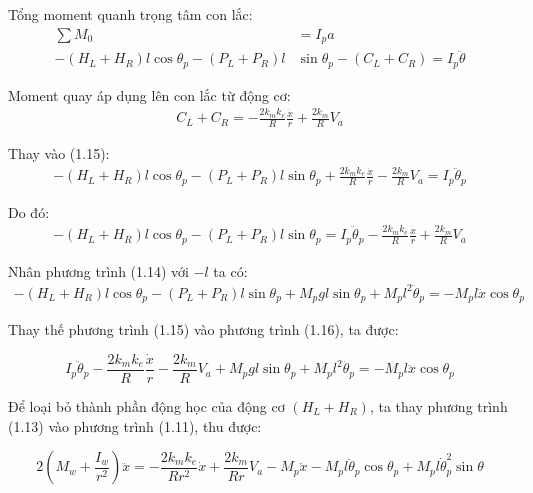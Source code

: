             Tổng moment quanh trọng tâm con lắc:
            \begin{align}
                \sum M_0 &= I_p a \nonumber \\
                -(H_L + H_R) l \cos \theta_p - (P_L + P_R) l&    \sin \theta_p - (C_L + C_R) = I_p \ddot{\theta} 
            \end{align}
            
            Moment quay áp dụng lên con lắc từ động cơ:
            \begin{align*}
                C_L + C_R = -\frac{2k_m k_e}{R} \frac{\dot{x}}{r} + \frac{2k_m}{R} V_a 
            \end{align*}
            
            Thay vào (1.15):
            \begin{align*}
                -(H_L + H_R) l \cos \theta_p - (P_L + P_R) l \sin \theta_p + \frac{2k_m k_e}{R} \frac{\dot{x}}{r} - \frac{2k_m}{R} V_a = I_p \ddot{\theta}_{p} 
            \end{align*}

            Do đó:
            \begin{align}
                -(H_L + H_R) l \cos \theta_p - (P_L + P_R) l \sin \theta_p = I_p \ddot{\theta}_{p} - \frac{2k_m k_e}{R} \frac{\dot{x}}{r} + \frac{2k_m}{R} V_a
            \end{align}

            Nhân phương trình (1.14) với $-l$ ta có:
            \begin{align*}
                -(H_L + H_R) l \cos \theta_p - (P_L + P_R) l \sin \theta_p + M_p g l \sin \theta_p + M_p l^2 \ddot{\theta}_p = -M_p l \ddot{x} \cos \theta_p 
            \end{align*}

            Thay thế phương trình (1.15) vào phương trình (1.16), ta được:

            \begin{equation}
                I_p \ddot{\theta}_p - \frac{2k_m k_e}{R} \frac{\dot{x}}{r} - \frac{2k_m}{R} V_a + M_p g l \sin\theta_p + M_p l^2 \ddot{\theta}_p = -M_p l \ddot{x} \cos\theta_p
            \end{equation}

            Để loại bỏ thành phần động học của động cơ \( (H_L + H_R) \), ta thay phương trình (1.13) vào phương trình (1.11), thu được:

            \begin{equation}
                2\left(M_w + \frac{I_w}{r^2} \right) \ddot{x} = -\frac{2k_m k_e}{R r^2} \dot{x} + \frac{2k_m}{R r} V_a - M_p \ddot{x} - M_p l \ddot{\theta}_p \cos\theta_p + M_p l \dot{\theta}_p^2 \sin\theta
            \end{equation}

